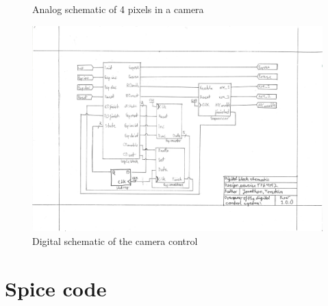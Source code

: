 \documentclass[a4paper, 12pt, english]{article}
\begin{document}
\begin{appendices}
\begin{figure}[H]
    \caption{Analog schematic of 4 pixels in a camera}
    \label{fig:analogCamera}
  \end{figure}
  \begin{figure}[H]
    \centering
    \includegraphics[angle=-90, scale=0.73]{figures/SchematicDigital}
    \caption{Digital schematic of the camera control}
    \label{fig:digitalControl}
  \end{figure}

  \newpage
  
  \section{Spice code} \label{ap:SpiceCode}
  
  
  
  
  
  
  
  \newpage
  

\end{appendices}
\end{document}
